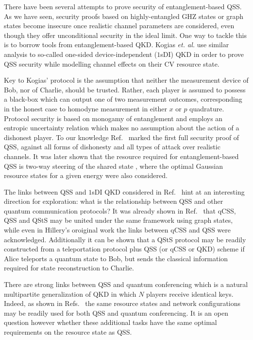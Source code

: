 There have been several attempts to prove security of entanglement-based QSS. As we have seen, security proofs based on highly-entangled GHZ states or graph states become insecure once realistic channel parameters are considered, even though they offer unconditional security in the ideal limit. One way to tackle this is to borrow tools from entanglement-based QKD. Kogias \emph{et. al.} \cite{Kogias2017} use similar analysis to so-called one-sided device-independent ($1$sDI) QKD \cite{Walk2016, Armstrong2015} in order to prove QSS security while modelling channel effects on their CV resource state.

Key to Kogias' protocol is the assumption that neither the measurement device of Bob, nor of Charlie, should be trusted. Rather, each player is assumed to possess a black-box which can output one of two measurement outcomes, corresponding in the honest case to homodyne measurement in either $x$ or $p$ quadrature. Protocol security is based on monogamy of entanglement and employs an entropic uncertainty relation which makes no assumption about the action of a dishonest player. To our knowledge Ref.~\cite{Kogias2017} marked the first full security proof of QSS, against all forms of dishonesty and all types of attack over realistic channels. It was later shown that the resource required for entanglement-based QSS is two-way steering of the shared state \cite{Xiang2017}, where the optimal Gaussian resource states for a given energy were also considered. 

The links between QSS and $1$sDI QKD considered in Ref.~\cite{Kogias2017} hint at an interesting direction for exploration: what is the relationship between QSS and other quantum communication protocols? It was already shown in Ref.~\cite{Markham2008} that qCSS, QSS and QStS may be united under the same framework using graph states, while even in Hillery's oroiginal work \cite{Hillery1999} the links between qCSS and QSS were acknowledged. Additionally it can be shown \cite{Hillery1999} that a QStS protocol may be readily constructed from a teleportation protocol plus QSS (or qCSS or QKD) scheme if Alice teleports a quantum state to Bob, but sends the classical information required for state reconstruction to Charlie.

There are strong links between QSS and quantum conferencing \cite{Wu2016, Ottaviani2017b} which is a natural multipartite generalization of QKD in which $N$ players receive identical keys. Indeed, as shown in Refs.~\cite{Wu2016, Ottaviani2017b} the same resource states and network configurations may be readily used for both QSS and quantum conferencing. It is an open question however whether these additional tasks have the same optimal requirements \cite{Kogias2017, Xiang2017} on the resource state as QSS. %


